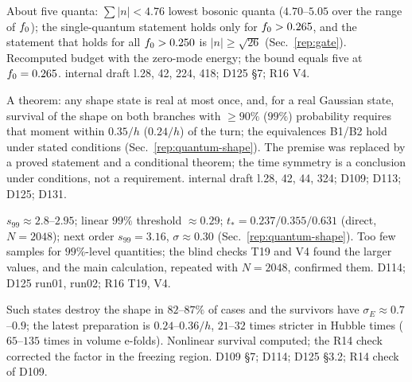 \begin{description}
{About five quanta: $\sum|n|<4.76$ lowest bosonic quanta ($4.70$--$5.05$ over the range of $f_0$); the single-quantum statement holds only for $f_0>0.265$, and the statement that holds for all $f_0>0.250$ is $|n|\ge\sqrt{26}$ (Sec.~\ref{rep:gate}).}
{Recomputed budget with the zero-mode energy; the bound equals five at $f_0=0.265$.}
{internal draft l.28, 42, 224, 418; D125 \S7; R16 V4.}

{A theorem: any shape state is real at most once, and, for a real Gaussian state, survival of the shape on both branches with $\ge90\%$ ($99\%$) probability requires that moment within $0.35/h$ ($0.24/h$) of the turn; the equivalences B1/B2 hold under stated conditions (Sec.~\ref{rep:quantum-shape}).}
{The premise was replaced by a proved statement and a conditional theorem; the time symmetry is a conclusion under conditions, not a requirement.}
{internal draft l.28, 42, 44, 324; D109; D113; D125; D131.}

{$s_{99}\approx2.8$--$2.95$; linear $99\%$ threshold $\approx0.29$; $t_*=0.237/\allowbreak 0.355/\allowbreak 0.631$ (direct, $N=2048$); next order $s_{99}=3.16$, $\sigma\approx0.30$ (Sec.~\ref{rep:quantum-shape}).}
{Too few samples for $99\%$-level quantities; the blind checks T19 and V4 found the larger values, and the main calculation, repeated with $N=2048$, confirmed them.}
{D114; D125 run01, run02; R16 T19, V4.}

{Such states destroy the shape in $82$--$87\%$ of cases and the survivors have $\sigma_E\approx0.7$--$0.9$; the latest preparation is $0.24$--$0.36/h$, $21$--$32$ times stricter in Hubble times ($65$--$135$ times in volume e-folds).}
{Nonlinear survival computed; the R14 check corrected the factor in the freezing region.}
{D109 \S7; D114; D125 \S3.2; R14 check of D109.}


\end{description}
